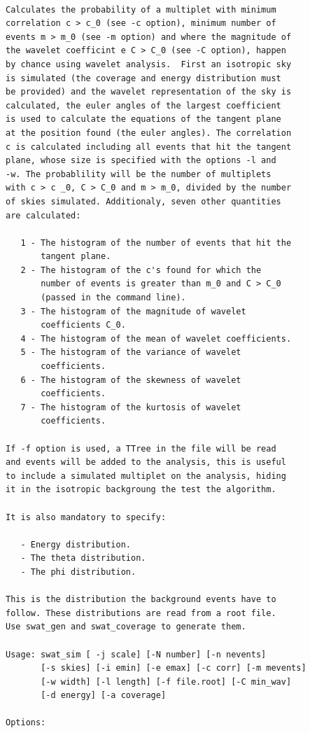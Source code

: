 \documentclass[12pt]{article}
\begin{document}
{\bf \color{textcolor}
\begin{lstlisting}

Calculates the probability of a multiplet with minimum
correlation c > c_0 (see -c option), minimum number of
events m > m_0 (see -m option) and where the magnitude of
the wavelet coefficint e C > C_0 (see -C option), happen
by chance using wavelet analysis.  First an isotropic sky
is simulated (the coverage and energy distribution must
be provided) and the wavelet representation of the sky is
calculated, the euler angles of the largest coefficient
is used to calculate the equations of the tangent plane
at the position found (the euler angles). The correlation
c is calculated including all events that hit the tangent
plane, whose size is specified with the options -l and
-w. The probablility will be the number of multiplets
with c > c _0, C > C_0 and m > m_0, divided by the number
of skies simulated. Additionaly, seven other quantities
are calculated:
   
   1 - The histogram of the number of events that hit the
       tangent plane.
   2 - The histogram of the c's found for which the
       number of events is greater than m_0 and C > C_0
       (passed in the command line).
   3 - The histogram of the magnitude of wavelet
       coefficients C_0.
   4 - The histogram of the mean of wavelet coefficients.
   5 - The histogram of the variance of wavelet
       coefficients.
   6 - The histogram of the skewness of wavelet
       coefficients.
   7 - The histogram of the kurtosis of wavelet
       coefficients.
   
If -f option is used, a TTree in the file will be read
and events will be added to the analysis, this is useful
to include a simulated multiplet on the analysis, hiding
it in the isotropic backgroung the test the algorithm.

It is also mandatory to specify:

   - Energy distribution.
   - The theta distribution.
   - The phi distribution.

This is the distribution the background events have to
follow. These distributions are read from a root file.
Use swat_gen and swat_coverage to generate them.

Usage: swat_sim [ -j scale] [-N number] [-n nevents] 
       [-s skies] [-i emin] [-e emax] [-c corr] [-m mevents]
       [-w width] [-l length] [-f file.root] [-C min_wav]
       [-d energy] [-a coverage]

Options:


\end{lstlisting}}
\end{document}
